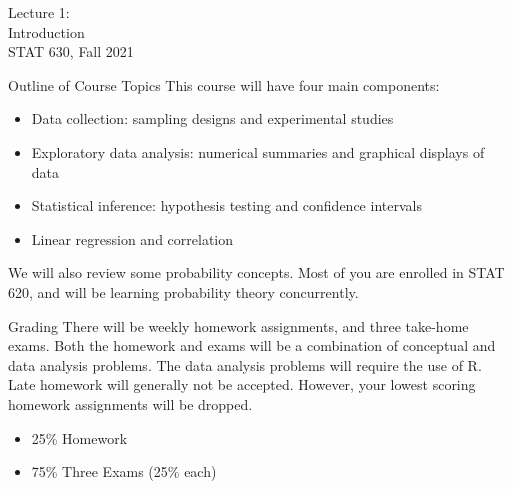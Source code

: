 \documentclass[10pt]{beamer}
\begin{document}
\begin{frame}
\large
Lecture 1:\\
Introduction\\
STAT 630, Fall 2021
\end{frame}

\begin{frame}{Outline of Course Topics}
This course will have four main components:
\vspace{5pt}
\begin{itemize}
\item Data collection: sampling designs and experimental studies
\vspace{5pt}
\item Exploratory data analysis: numerical summaries and graphical displays of data
\vspace{5pt}
\item Statistical inference: hypothesis testing and confidence intervals 
\vspace{5pt}
\item Linear regression and correlation\\
\end{itemize}
\vspace{10pt}
We will also review some probability concepts.  Most of you are enrolled in STAT 620, and will be learning probability theory concurrently. 
\end{frame}

\begin{frame}{Grading}
There will be weekly homework assignments, and three take-home exams.  Both the homework and exams will be a combination of conceptual and data analysis problems.  The data analysis problems will require the use of R.  Late homework will generally not be accepted.  However, your lowest scoring homework assignments will be dropped.\\
\vspace{5pt}

\begin{itemize}
\item 25\% Homework
\vspace{5pt}
\item 75\% Three Exams (25\% each)
\end{itemize} 
\end{frame}
\end{document}
